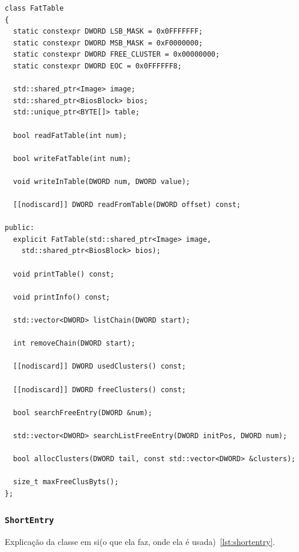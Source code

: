 \documentclass[
    12pt,				%
    oneside,   	        %
    a4paper,			%
    english,			%
    french,				%
    spanish,			%
    brazil,				%
    ]{pacotes/abntex2}
\begin{document}
\begin{lstlisting}[caption={Classe a estrutura FAT}, label={lst:fat_table}]
class FatTable
{
  static constexpr DWORD LSB_MASK = 0x0FFFFFFF;
  static constexpr DWORD MSB_MASK = 0xF0000000;
  static constexpr DWORD FREE_CLUSTER = 0x00000000;
  static constexpr DWORD EOC = 0x0FFFFFF8;
  
  std::shared_ptr<Image> image;
  std::shared_ptr<BiosBlock> bios;
  std::unique_ptr<BYTE[]> table;

  bool readFatTable(int num);

  bool writeFatTable(int num);

  void writeInTable(DWORD num, DWORD value);

  [[nodiscard]] DWORD readFromTable(DWORD offset) const;

public:
  explicit FatTable(std::shared_ptr<Image> image,
    std::shared_ptr<BiosBlock> bios);

  void printTable() const;

  void printInfo() const;

  std::vector<DWORD> listChain(DWORD start);

  int removeChain(DWORD start);

  [[nodiscard]] DWORD usedClusters() const;

  [[nodiscard]] DWORD freeClusters() const;

  bool searchFreeEntry(DWORD &num);

  std::vector<DWORD> searchListFreeEntry(DWORD initPos, DWORD num);

  bool allocClusters(DWORD tail, const std::vector<DWORD> &clusters);

  size_t maxFreeClusByts();
};
\end{lstlisting}

\subsubsection{\texttt{ShortEntry}}
\label{subsubsec:short_entry}

Explicação da classe em si(o que ela faz, onde ela é usada)~\ref{lst:shortentry}.
\end{document}
